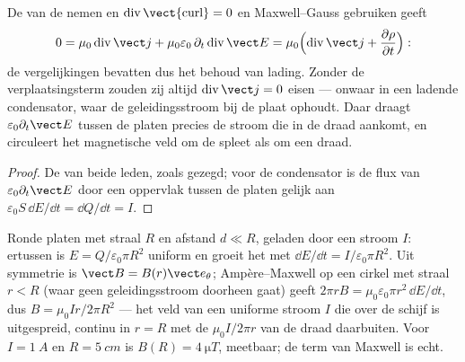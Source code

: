 \begin{proposition}\label{prop:b2:maxwell-equations:displacement}
De  van de  nemen en
$\operatorname{div}\operatorname{\vect{curl}} = 0$ en Maxwell--Gauss
gebruiken geeft
\[
0 = \mu_0\operatorname{div}\vect j + \mu_0\varepsilon_0\,\partial_t\operatorname{div}\vect E
= \mu_0\Bigl(\operatorname{div}\vect j + \frac{\partial\rho}{\partial t}\Bigr) :
\]
de vergelijkingen bevatten dus het behoud van lading. Zonder de
verplaatsingsterm zouden zij altijd $\operatorname{div}\vect j = 0$ eisen
--- onwaar in een ladende condensator, waar de geleidingsstroom bij de plaat
ophoudt. Daar draagt $\varepsilon_0\partial_t\vect E$ tussen de platen
precies de stroom die in de draad aankomt, en circuleert het magnetische
veld om de spleet als om een draad.
\end{proposition}

\begin{proof}
De  van beide leden, zoals gezegd; voor de condensator is de flux
van $\varepsilon_0\partial_t\vect E$ door een oppervlak tussen de platen
gelijk aan $\varepsilon_0S\,\dd E/\dd t = \dd Q/\dd t = I$.
\end{proof}

\begin{example}\label{ex:b2:maxwell-equations:capacitor}
Ronde platen met straal $R$ en afstand $d \ll R$, geladen door een stroom
$I$: ertussen is $E = Q/\varepsilon_0\pi R^2$ uniform en groeit het met
$\dd E/
\dd t = I/\varepsilon_0\pi R^2$. Uit symmetrie is
$\vect B = B(r)\vect e_\theta$; Ampère--Maxwell op een cirkel met straal
$r < R$ (waar geen geleidingsstroom doorheen gaat) geeft
$2\pi rB
= \mu_0\varepsilon_0\pi r^2\,\dd E/\dd t$, dus
$B = \mu_0Ir/2\pi R^2$ --- het veld van een uniforme stroom $I$ die over de
schijf is uitgespreid, continu in $r = R$ met de $\mu_0I/2\pi r$ van de
draad daarbuiten. Voor $I = \qty{1}{A}$ en $R = \qty{5}{cm}$ is
$B(R) =
\qty{4}{\micro T}$, meetbaar; de term van Maxwell is echt.
\end{example}

